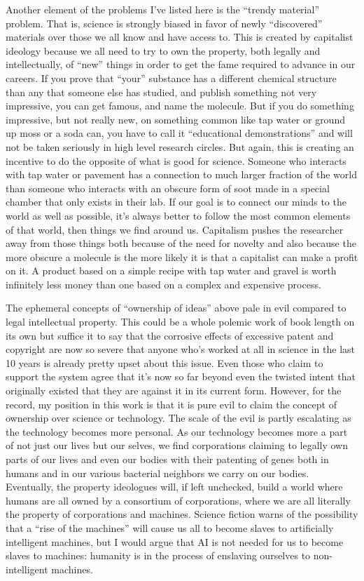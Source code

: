 Another element of the problems I've listed here is the ``trendy
material'' problem. That is, science is strongly biased in favor of
newly ``discovered'' materials over those we all know and have access
to. This is created by capitalist ideology because we all need to try to
own the property, both legally and intellectually, of ``new'' things in
order to get the fame required to advance in our careers. If you prove
that ``your'' substance has a different chemical structure than any that
someone else has studied, and publish something not very impressive, you
can get famous, and name the molecule. But if you do something
impressive, but not really new, on something common like tap water or
ground up moss or a soda can, you have to call it ``educational
demonstrations'' and will not be taken seriously in high level research
circles. But again, this is creating an incentive to do the opposite of
what is good for science. Someone who interacts with tap water or
pavement has a connection to much larger fraction of the world than
someone who interacts with an obscure form of soot made in a special
chamber that only exists in their lab. If our goal is to connect our
minds to the world as well as possible, it's always better to follow the
most common elements of that world, then things we find around us.
Capitalism pushes the researcher away from those things both because of
the need for novelty and also because the more obscure a molecule is the
more likely it is that a capitalist can make a profit on it. A product
based on a simple recipe with tap water and gravel is worth infinitely
less money than one based on a complex and expensive process.

The ephemeral concepts of ``ownership of ideas'' above pale in evil
compared to legal intellectual property. This could be a whole polemic
work of book length on its own but suffice it to say that the corrosive
effects of excessive patent and copyright are now so severe that anyone
who's worked at all in science in the last 10 years is already pretty
upset about this issue. Even those who claim to support the system agree
that it's now so far beyond even the twisted intent that originally
existed that they are against it in its current form. However, for the
record, my position in this work is that it is pure evil to claim the
concept of ownership over science or technology. The scale of the evil
is partly escalating as the technology becomes more personal. As our
technology becomes more a part of not just our lives but our selves, we
find corporations claiming to legally own parts of our lives and even
our bodies with their patenting of genes both in humans and in our
various bacterial neighbors we carry on our bodies. Eventually, the
property ideologues will, if left unchecked, build a world where humans
are all owned by a consortium of corporations, where we are all
literally the property of corporations and machines. Science fiction
warns of the possibility that a ``rise of the machines'' will cause us
all to become slaves to artificially intelligent machines, but I would
argue that AI is not needed for us to become slaves to machines:
humanity is in the process of enslaving ourselves to non-intelligent
machines.

